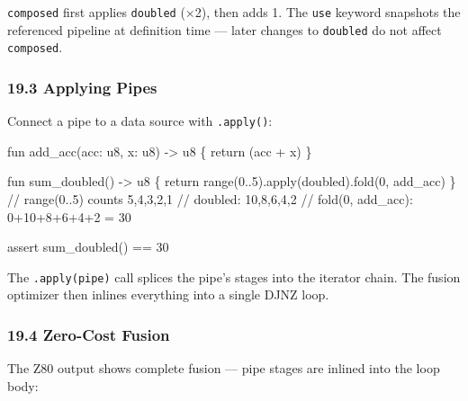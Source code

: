 \documentclass[
  11pt,
]{article}
\newenvironment{Shaded}{\begin{snugshade}}{\end{snugshade}}
\newcommand{\NormalTok}[1]{#1}
\begin{document}
\texttt{composed} first applies \texttt{doubled} (×2), then adds 1. The
\texttt{use} keyword snapshots the referenced pipeline at definition
time --- later changes to \texttt{doubled} do not affect
\texttt{composed}.

\hypertarget{applying-pipes}{%
\subsubsection{19.3 Applying Pipes}\label{applying-pipes}}

Connect a pipe to a data source with \texttt{.apply()}:

\begin{Shaded}
\begin{Highlighting}[]
\NormalTok{fun add\_acc(acc: u8, x: u8) {-}\textgreater{} u8 \{ return (acc + x) \}}

\NormalTok{fun sum\_doubled() {-}\textgreater{} u8 \{}
\NormalTok{    return range(0..5).apply(doubled).fold(0, add\_acc)}
\NormalTok{\}}
\NormalTok{// range(0..5) counts 5,4,3,2,1}
\NormalTok{// doubled: 10,8,6,4,2}
\NormalTok{// fold(0, add\_acc): 0+10+8+6+4+2 = 30}

\NormalTok{assert sum\_doubled() == 30}
\end{Highlighting}
\end{Shaded}

The \texttt{.apply(pipe)} call splices the pipe's stages into the
iterator chain. The fusion optimizer then inlines everything into a
single DJNZ loop.

\hypertarget{zero-cost-fusion}{%
\subsubsection{19.4 Zero-Cost Fusion}\label{zero-cost-fusion}}

The Z80 output shows complete fusion --- pipe stages are inlined into
the loop body:
\end{document}
